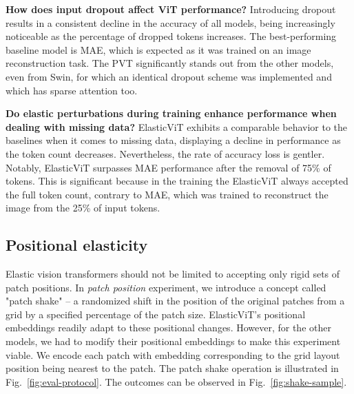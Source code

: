 \documentclass[10pt,twocolumn,letterpaper]{article}
\newcommand{\ours}[0]{ElasticViT\xspace}
\begin{document}
\textbf{How does input dropout affect ViT performance?}
Introducing dropout results in a consistent decline in the accuracy of all models, being increasingly noticeable as the percentage of dropped tokens increases. 
The best-performing baseline model is MAE, which is expected as it was trained on an image reconstruction task. The PVT significantly stands out from the other models, even from Swin, for which an identical dropout scheme was implemented and which has sparse attention too.



\textbf{Do elastic perturbations during training enhance performance when dealing with missing data?}
ElasticViT exhibits a comparable behavior to the baselines when it comes to missing data, displaying a decline in performance as the token count decreases. Nevertheless, the rate of accuracy loss is gentler. Notably, ElasticViT surpasses MAE performance after the removal of 75\% of tokens.
This is significant because in the training the \ours{} always accepted the full token count, contrary to MAE, which was trained to reconstruct the image from the 25\% of input tokens.


\subsection{Positional elasticity} \label{sec:pos-elasticity}

Elastic vision transformers should not be limited to accepting only rigid sets of patch positions. In \textit{patch position} experiment, we introduce a concept called "patch shake" – a randomized shift in the position of the original patches from a grid by a specified percentage of the patch size. ElasticViT's positional embeddings readily adapt to these positional changes. However, for the other models, we had to modify their positional embeddings to make this experiment viable. We encode each patch with embedding corresponding to the grid layout position being nearest to the patch. The patch shake operation is illustrated in Fig.~\ref{fig:eval-protocol}. The outcomes can be observed in Fig.~\ref{fig:shake-sample}.
\end{document}
